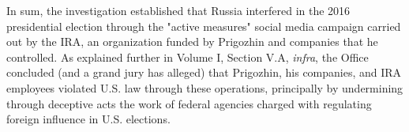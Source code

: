 \hr

In sum, the investigation established that Russia interfered in the 2016 presidential election through the "active measures" social media campaign carried out by the IRA, an organization funded by Prigozhin and companies that he controlled.
As explained further in Volume I, Section V.A, \textit{infra}, the Office concluded (and a grand jury has alleged) that Prigozhin, his companies, and IRA employees violated U.S. law through these operations, principally by undermining through deceptive acts the work of federal agencies charged with regulating foreign influence in U.S. elections.
